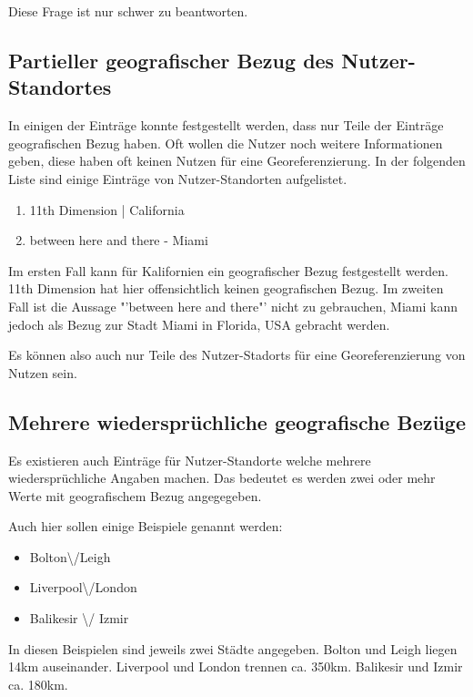 			Diese Frage ist nur schwer zu beantworten. 

		\subsection{Partieller geografischer Bezug des Nutzer-Standortes}

			In einigen der Einträge konnte festgestellt werden, dass nur Teile der Einträge geografischen Bezug haben. 
			Oft wollen die Nutzer noch weitere Informationen geben, diese haben oft keinen Nutzen für eine Georeferenzierung. 
			In der folgenden Liste sind einige Einträge von Nutzer-Standorten aufgelistet. 

			\begin{enumerate}
				\item 11th Dimension | California
				\item between here and there - Miami
			\end{enumerate}

			Im ersten Fall kann für Kalifornien ein geografischer Bezug festgestellt werden.
			11th Dimension hat hier offensichtlich keinen geografischen Bezug.
			Im zweiten Fall ist die Aussage "'between here and there"' nicht zu gebrauchen, Miami kann jedoch als Bezug zur Stadt Miami in Florida, USA gebracht werden.
			
			Es können also auch nur Teile des Nutzer-Stadorts für eine Georeferenzierung von Nutzen sein.


		\subsection{Mehrere wiedersprüchliche geografische Bezüge} 

			Es existieren auch Einträge für Nutzer-Standorte welche mehrere wiedersprüchliche Angaben machen.
			Das bedeutet es werden zwei oder mehr Werte mit geografischem Bezug angegegeben.

			Auch hier sollen einige Beispiele genannt werden:

			\begin{itemize}
				\item Bolton\textbackslash/Leigh
				\item Liverpool\textbackslash/London
				\item  Balikesir \textbackslash/ Izmir	
			\end{itemize}							
				
			In diesen Beispielen sind jeweils zwei Städte angegeben.
			Bolton und Leigh liegen 14km auseinander.
			Liverpool und London trennen ca. 350km.
			Balikesir und Izmir ca. 180km.

